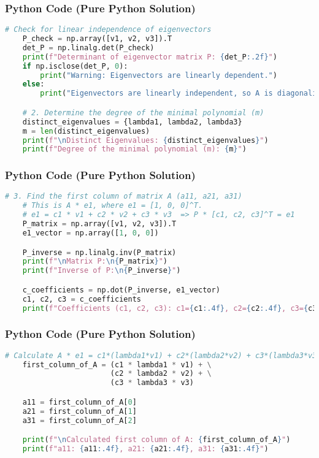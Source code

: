 \documentclass{beamer}
\begin{document}
\begin{frame}[fragile]
\frametitle{Python Code (Pure Python Solution)}
\begin{lstlisting}[language=Python]
    # Check for linear independence of eigenvectors
    P_check = np.array([v1, v2, v3]).T
    det_P = np.linalg.det(P_check)
    print(f"Determinant of eigenvector matrix P: {det_P:.2f}")
    if np.isclose(det_P, 0):
        print("Warning: Eigenvectors are linearly dependent.")
    else:
        print("Eigenvectors are linearly independent, so A is diagonalizable.")

    # 2. Determine the degree of the minimal polynomial (m)
    distinct_eigenvalues = {lambda1, lambda2, lambda3}
    m = len(distinct_eigenvalues)
    print(f"\nDistinct Eigenvalues: {distinct_eigenvalues}")
    print(f"Degree of the minimal polynomial (m): {m}")
\end{lstlisting}
\end{frame}

\begin{frame}[fragile]
\frametitle{Python Code (Pure Python Solution)}
\begin{lstlisting}[language=Python]
    # 3. Find the first column of matrix A (a11, a21, a31)
    # This is A * e1, where e1 = [1, 0, 0]^T.
    # e1 = c1 * v1 + c2 * v2 + c3 * v3  => P * [c1, c2, c3]^T = e1
    P_matrix = np.array([v1, v2, v3]).T
    e1_vector = np.array([1, 0, 0])

    P_inverse = np.linalg.inv(P_matrix)
    print(f"\nMatrix P:\n{P_matrix}")
    print(f"Inverse of P:\n{P_inverse}")

    c_coefficients = np.dot(P_inverse, e1_vector)
    c1, c2, c3 = c_coefficients
    print(f"Coefficients (c1, c2, c3): c1={c1:.4f}, c2={c2:.4f}, c3={c3:.4f}")
\end{lstlisting}
\end{frame}

\begin{frame}[fragile]
\frametitle{Python Code (Pure Python Solution)}
\begin{lstlisting}[language=Python]
    # Calculate A * e1 = c1*(lambda1*v1) + c2*(lambda2*v2) + c3*(lambda3*v3)
    first_column_of_A = (c1 * lambda1 * v1) + \
                        (c2 * lambda2 * v2) + \
                        (c3 * lambda3 * v3)

    a11 = first_column_of_A[0]
    a21 = first_column_of_A[1]
    a31 = first_column_of_A[2]

    print(f"\nCalculated first column of A: {first_column_of_A}")
    print(f"a11: {a11:.4f}, a21: {a21:.4f}, a31: {a31:.4f}")
\end{lstlisting}
\end{frame}
\end{document}
